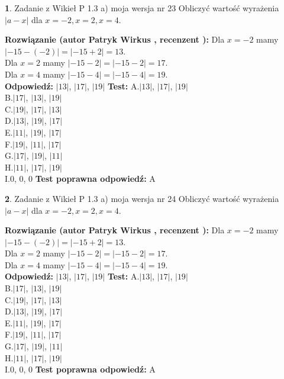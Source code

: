 \documentclass[12pt, a4paper]{article}
\theoremstyle{definition} %
\newtheorem{zad}{}
\newcommand{\zadStart}[1]{\begin{zad}#1\newline}
\newcommand{\zadStop}{\end{zad}}
\newcommand{\rozwStart}[2]{\noindent \textbf{Rozwiązanie (autor #1 , recenzent #2): }\newline}
\newcommand{\rozwStop}{\newline}
\newcommand{\odpStart}{\noindent \textbf{Odpowiedź:}\newline}
\newcommand{\odpStop}{\newline}
\newcommand{\testStart}{\noindent \textbf{Test:}\newline}
\newcommand{\testStop}{\newline}
\newcommand{\kluczStart}{\noindent \textbf{Test poprawna odpowiedź:}\newline}
\newcommand{\kluczStop}{\newline}
\begin{document}
\zadStart{Zadanie z Wikieł P 1.3 a) moja wersja nr 23}
Obliczyć wartość wyrażenia $|a - x|$ dla $x=-2,x=2,x=4$.
\zadStop
\rozwStart{Patryk Wirkus}{}
Dla $x = -2$ mamy $|-15 - (-2)| = |-15 + 2| = 13$.\\
Dla $x = 2$ mamy $|-15 - 2| = |-15 - 2| = 17$.\\
Dla $x = 4$ mamy $|-15 - 4| = |-15 - 4| = 19$.\\
\rozwStop
\odpStart
$|13|$, $|17|$, $|19|$
\odpStop
\testStart
A.$|13|$, $|17|$, $|19|$\\
B.$|17|$, $|13|$, $|19|$\\
C.$|19|$, $|17|$, $|13|$\\
D.$|13|$, $|19|$, $|17|$\\
E.$|11|$, $|19|$, $|17|$\\
F.$|19|$, $|11|$, $|17|$\\
G.$|17|$, $|19|$, $|11|$\\
H.$|11|$, $|17|$, $|19|$\\
I.$0$, $0$, $0$
\testStop
\kluczStart
A
\kluczStop



\zadStart{Zadanie z Wikieł P 1.3 a) moja wersja nr 24}
Obliczyć wartość wyrażenia $|a - x|$ dla $x=-2,x=2,x=4$.
\zadStop
\rozwStart{Patryk Wirkus}{}
Dla $x = -2$ mamy $|-15 - (-2)| = |-15 + 2| = 13$.\\
Dla $x = 2$ mamy $|-15 - 2| = |-15 - 2| = 17$.\\
Dla $x = 4$ mamy $|-15 - 4| = |-15 - 4| = 19$.\\
\rozwStop
\odpStart
$|13|$, $|17|$, $|19|$
\odpStop
\testStart
A.$|13|$, $|17|$, $|19|$\\
B.$|17|$, $|13|$, $|19|$\\
C.$|19|$, $|17|$, $|13|$\\
D.$|13|$, $|19|$, $|17|$\\
E.$|11|$, $|19|$, $|17|$\\
F.$|19|$, $|11|$, $|17|$\\
G.$|17|$, $|19|$, $|11|$\\
H.$|11|$, $|17|$, $|19|$\\
I.$0$, $0$, $0$
\testStop
\kluczStart
A
\kluczStop
\end{document}
